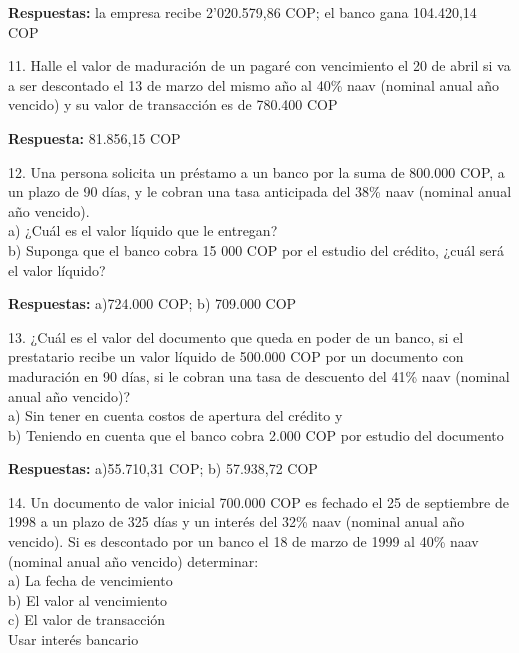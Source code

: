        \textbf{Respuestas:} la empresa recibe 2’020.579,86 COP; el banco gana 104.420,14 COP 
       \medskip

 \item 11. Halle el valor de maduración de un pagaré con vencimiento el 20 de abril si va a ser descontado el 13 de marzo del mismo año al 40\% naav (nominal anual año vencido) y su valor de transacción es de 780.400 COP
 
  \textbf{Respuesta:} 81.856,15 COP 
       \medskip

 \item 12. Una persona solicita un préstamo a un banco por la suma de 800.000 COP, a un plazo de 90 días, y le cobran una tasa anticipada del 38\% naav (nominal anual año vencido).\\

       a) ¿Cuál es el valor líquido que le entregan?\\
       b) Suponga que el banco cobra 15 000 COP por el estudio del crédito, ¿cuál será el valor líquido?

       \textbf{Respuestas:} a)724.000 COP; b) 709.000 COP 
       \medskip

 \item 13. ¿Cuál es el valor del documento que queda en poder de un banco, si el prestatario recibe un valor líquido de 500.000 COP por un documento con maduración en 90 días, si le cobran una tasa de descuento del 41\% naav (nominal anual año vencido)? \\

       a) Sin tener en cuenta costos de apertura del crédito y\\
       b) Teniendo en cuenta que el banco cobra 2.000 COP por estudio del documento 
       
        \textbf{Respuestas:} a)55.710,31 COP; b) 57.938,72 COP
       \medskip

 \item 14. Un documento de valor inicial 700.000 COP  es fechado el 25 de septiembre de 1998 a un plazo de 325 días y un interés del 32\% naav (nominal anual año vencido). Si es descontado por un banco el 18 de marzo de 1999 al 40\% naav (nominal anual año vencido) determinar:\\

       a) La fecha de vencimiento\\
       b) El valor al vencimiento\\
       c) El valor de transacción \\
       Usar interés bancario
       
